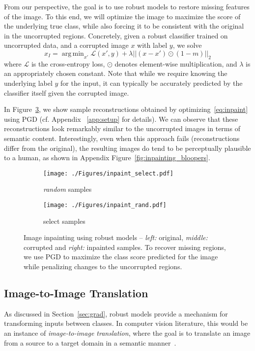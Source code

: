 \documentclass{article}
\DeclareMathOperator*{\argmin}{arg\,min}
\begin{document}
{From our perspective, the goal is to use robust models to restore missing features
of the image. To this end, we will optimize the image to 
maximize the score of the underlying true class, while also 
forcing it to be consistent with the original in the uncorrupted 
regions. Concretely, given a robust classifier trained on 
uncorrupted data, and a corrupted image $x$
with label $y$, we solve
\begin{equation}
x_I = \argmin_{x'} \mathcal{L}(x', y) + \lambda || (x - x') \odot (1 - m)||_2
\label{eq:inpaint}
\end{equation}
where $\mathcal{L}$
is the cross-entropy loss, $\odot$ denotes element-wise multiplication, and $\lambda$ is an appropriately chosen constant.
Note that while we require knowing the underlying label $y$ for the input, it can typically be
accurately predicted by the classifier itself given the corrupted image.

In Figure~\ref{fig:inpainting}, we show sample reconstructions obtained by
optimizing~\eqref{eq:inpaint} using PGD (cf. Appendix
~\ref{app:setup} for details). We can observe that these reconstructions
look remarkably similar to the uncorrupted images in terms of semantic 
content. Interestingly, even when this approach fails (reconstructions
differ from the original), the resulting images do tend to be perceptually
plausible to a human, as shown in Appendix Figure~\ref{fig:inpainting_bloopers}.


\begin{figure}[!h]
	\centering
	\begin{subfigure}[b]{0.49\textwidth}
	\centering
	\texttt{[image: ./Figures/inpaint\_select.pdf]}
	\caption{\emph{random} samples}
	\label{fig:inpaint_rand}
	\end{subfigure}
\hfil
	\begin{subfigure}[b]{0.49\textwidth}
	\centering
	\texttt{[image: ./Figures/inpaint\_rand.pdf]}
	\caption{select samples}
	\label{fig:inpaint_select}
\end{subfigure}
	\caption{Image inpainting using robust models -- \textit{left:} original,
	\textit{middle:} corrupted and \textit{right:} inpainted samples. 
	To recover 
	missing regions, we use PGD to maximize the class score predicted for the 
	image while penalizing changes to 
    the uncorrupted regions. }
	\label{fig:inpainting}
\end{figure}

 
\subsection{Image-to-Image Translation}
\label{sec:horse2zebra}
As discussed in Section~\ref{sec:grad}, robust 
models provide a mechanism for transforming inputs between classes.
In computer vision literature, this would be an instance of
{\em image-to-image translation}, where the goal is to translate an image
from a source to a target
domain in a semantic manner~\cite{hertzmann2001image}.

}
\end{document}
